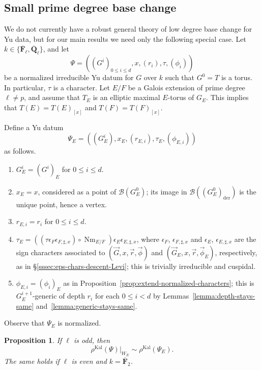 \documentclass[reqno]{amsart}
\numberwithin{equation}{subsection}
\newcommand{\F}{\mathbf{F}}
\newcommand{\Q}{\mathbf{Q}}
\newcommand{\ol}[1]{\overline{#1}}
\newcommand\cB{\mathcal{B}}
\DeclareMathOperator{\Nm}{Nm}
\DeclareMathOperator{\Kal}{Kal}
\DeclareMathOperator{\der}{der}
\newtheorem{prop}[thm]{Proposition}
\theoremstyle{remark}
\numberwithin{equation}{subsection}
\numberwithin{figure}{subsection}
\begin{document}
\subsection{Small prime degree base change}\label{ss:small-prime-deg-bc-kal}
We do not currently have a robust general theory of low degree base change for Yu data, but for our main results we need only the following special case. Let $k\in\{\ol\F_\ell,\ol\Q_\ell\}$, and let
\[
\Psi=((G^i)_{0\leq i\leq d},x,(r_i),\tau,(\phi_i))
\]
be a normalized irreducible Yu datum for $G$ over $k$ such that $G^0=T$ is a torus. In particular, $\tau$ is a character. Let $E/F$ be a Galois extension of prime degree $\ell\ne p$, and assume that $T_E$ is an elliptic maximal $E$-torus of $G_E$. This implies that $T(E)=T(E)_{[x]}$ and $T(F)=T(F)_{[x]}$.

Define a Yu datum
\[
\Psi_E=((G_E^i),x_E,(r_{E,i}),\tau_E,(\phi_{E,i}))
\]
as follows.
\begin{enumerate}
\item $G_E^i = (G^i)_E$ for $0 \leq i \leq d$.
\item $x_E = x$, considered as a point of $\cB(G^0_E)$; its image in $\cB((G^0_E)_{\der})$ is the unique point, hence a vertex.
\item $r_{E,i} = r_i$ for $0 \leq i \leq d$.
\item $\tau_E = ((\tau\epsilon_F\epsilon_{F,\sharp,x}) \circ \Nm_{E/F})\epsilon_E\epsilon_{E,\sharp,x}$, where $\epsilon_F$, $\epsilon_{F,\sharp,x}$ and $\epsilon_E$, $\epsilon_{E,\sharp,x}$ are the sign characters associated to $(\vec G, x, \vec r, \vec\phi)$ and $(\vec G_E, x, \vec r, \vec\phi_E)$, respectively, as in \S\ref{sssec:eps-chars-descent-Levi}; this is trivially irreducible and cuspidal.
\item $\phi_{E,i} = (\phi_i)_E$ as in Proposition~\ref{prop:extend-normalized-characters}; this is $G_E^{i+1}$-generic of depth $r_i$ for each $0 \leq i < d$ by Lemmas~\ref{lemma:depth-stays-same} and~\ref{lemma:generic-stays-same}.
\end{enumerate}
Observe that $\Psi_E$ is normalized.

\begin{prop}\label{prop:kal-small-degree-bc}
If $\ell$ is odd, then
\[
\rho^{\Kal}(\Psi)|_{W_E}
\sim
\rho^{\Kal}(\Psi_E).
\]
The same holds if $\ell$ is even and $k = \ol\F_2$.
\end{prop}
\end{document}
